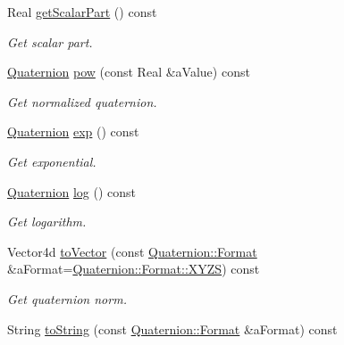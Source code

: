 \begin{DoxyCompactItemize}
Real \hyperlink{classostk_1_1math_1_1geom_1_1d3_1_1trf_1_1rot_1_1_quaternion_a6cb0e23d41afd8477e97fa764d416e1e}{get\+Scalar\+Part} () const
\begin{DoxyCompactList}\small\item\em Get scalar part. \end{DoxyCompactList}\item 
\hyperlink{classostk_1_1math_1_1geom_1_1d3_1_1trf_1_1rot_1_1_quaternion}{Quaternion} \hyperlink{classostk_1_1math_1_1geom_1_1d3_1_1trf_1_1rot_1_1_quaternion_a3a2925f9a267c5f12f4419b7cf776614}{pow} (const Real \&a\+Value) const
\begin{DoxyCompactList}\small\item\em Get normalized quaternion. \end{DoxyCompactList}\item 
\hyperlink{classostk_1_1math_1_1geom_1_1d3_1_1trf_1_1rot_1_1_quaternion}{Quaternion} \hyperlink{classostk_1_1math_1_1geom_1_1d3_1_1trf_1_1rot_1_1_quaternion_ab52abec08a04aa42646b2f418b7ba964}{exp} () const
\begin{DoxyCompactList}\small\item\em Get exponential. \end{DoxyCompactList}\item 
\hyperlink{classostk_1_1math_1_1geom_1_1d3_1_1trf_1_1rot_1_1_quaternion}{Quaternion} \hyperlink{classostk_1_1math_1_1geom_1_1d3_1_1trf_1_1rot_1_1_quaternion_a0ced27267be4ede14ab115f2febc55a3}{log} () const
\begin{DoxyCompactList}\small\item\em Get logarithm. \end{DoxyCompactList}\item 
Vector4d \hyperlink{classostk_1_1math_1_1geom_1_1d3_1_1trf_1_1rot_1_1_quaternion_af289de332e7a0033ad7989e64566d1a7}{to\+Vector} (const \hyperlink{classostk_1_1math_1_1geom_1_1d3_1_1trf_1_1rot_1_1_quaternion_aa7a75f0dd505a58236ee355959e00bfd}{Quaternion\+::\+Format} \&a\+Format=\hyperlink{classostk_1_1math_1_1geom_1_1d3_1_1trf_1_1rot_1_1_quaternion_aa7a75f0dd505a58236ee355959e00bfda11c51ecd5dc6f86ba3c1ae79e21482f5}{Quaternion\+::\+Format\+::\+X\+Y\+ZS}) const
\begin{DoxyCompactList}\small\item\em Get quaternion norm. \end{DoxyCompactList}\item 
String \hyperlink{classostk_1_1math_1_1geom_1_1d3_1_1trf_1_1rot_1_1_quaternion_a9a9e668493a595ce8186602ae0c38dc2}{to\+String} (const \hyperlink{classostk_1_1math_1_1geom_1_1d3_1_1trf_1_1rot_1_1_quaternion_aa7a75f0dd505a58236ee355959e00bfd}{Quaternion\+::\+Format} \&a\+Format) const

\end{DoxyCompactItemize}
